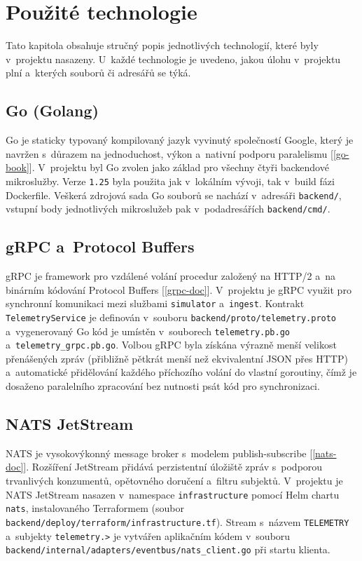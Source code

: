 \documentclass[11pt, a4paper, oneside]{article}
\begin{document}
\clearpage
\section{Použité technologie}

Tato kapitola obsahuje stručný popis jednotlivých technologií, které byly v~projektu nasazeny. U~každé technologie je uvedeno, jakou úlohu v~projektu plní a~kterých souborů či adresářů se týká.

\subsection{Go (Golang)}

Go je staticky typovaný kompilovaný jazyk vyvinutý společností Google, který je navržen s~důrazem na jednoduchost, výkon a~nativní podporu paralelismu [\ref{go-book}]. V~projektu byl Go zvolen jako základ pro všechny čtyři backendové mikroslužby. Verze \texttt{1.25} byla použita jak v~lokálním vývoji, tak v~build fázi Dockerfile. Veškerá zdrojová sada Go souborů se nachází v~adresáři \texttt{backend/}, vstupní body jednotlivých mikroslužeb pak v~podadresářích \texttt{backend/cmd/}.

\subsection{gRPC a~Protocol Buffers}

gRPC je framework pro vzdálené volání procedur založený na HTTP/2 a~na binárním kódování Protocol Buffers [\ref{grpc-doc}]. V~projektu je gRPC využit pro synchronní komunikaci mezi službami \texttt{simulator} a~\texttt{ingest}. Kontrakt \texttt{TelemetryService} je definován v~souboru \texttt{backend/proto/telemetry.proto} a~vygenerovaný Go kód je umístěn v~souborech \texttt{telemetry.pb.go} a~\texttt{telemetry\_grpc.pb.go}. Volbou gRPC byla získána výrazně menší velikost přenášených zpráv (přibližně pětkrát menší než ekvivalentní JSON přes HTTP) a~automatické přidělování každého příchozího volání do vlastní goroutiny, čímž je dosaženo paralelního zpracování bez nutnosti psát kód pro synchronizaci.

\subsection{NATS JetStream}

NATS je vysokovýkonný message broker s~modelem publish-subscribe [\ref{nats-doc}]. Rozšíření JetStream přidává perzistentní úložiště zpráv s~podporou trvanlivých konzumentů, opětovného doručení a~filtru subjektů. V~projektu je NATS JetStream nasazen v~namespace \texttt{infrastructure} pomocí Helm chartu \texttt{nats}, instalovaného Terraformem (soubor \texttt{backend/deploy/terraform/infrastructure.tf}). Stream s~názvem \texttt{TELEMETRY} a~subjekty \texttt{telemetry.>} je vytvářen aplikačním kódem v~souboru \texttt{backend/internal/adapters/eventbus/nats\_client.go} při startu klienta.
\end{document}
